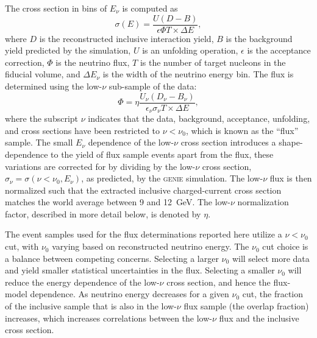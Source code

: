 \documentclass[%
reprint,
% 
superscriptaddress,
showpacs,
preprintnumbers,
showkeys,
nofootinbib,
 amsmath,amssymb,
 aps,
 prd,
floatfix,
]{revtex4-1}
\newcommand\lownu    {low-$\nu$\xspace}
\newcommand\enu      {$E_\nu$\xspace}
\newcommand\GENIE  {\textsc{genie}\xspace}
\begin{document}
The cross section in bins of \enu is computed as
\begin{equation}
    \sigma(E) = \frac{U(D-B)}{\epsilon\Phi T\times\Delta E},
    \label{eq:cross-section}
\end{equation}
where $D$ is the reconstructed inclusive interaction yield, $B$ is the background yield predicted by the simulation, $U$ is an unfolding operation, $\epsilon$ is the acceptance correction, $\Phi$ is the neutrino flux, $T$ is the number of target nucleons in the fiducial volume, and $\Delta E_\nu$ is the width of the neutrino energy bin. The flux is determined using the \lownu sub-sample of the data:
\begin{equation}
    \Phi = \eta\frac{U_\nu(D_\nu-B_\nu)}{\epsilon_\nu\sigma_\nu T\times\Delta E},
    \label{eq:flux}
\end{equation}
where the subscript $\nu$ indicates that the data, background, acceptance, unfolding, and cross sections have been restricted to $\nu<\nu_0$, which is known as the ``flux'' sample. The small \enu dependence of the \lownu cross section introduces a shape-dependence to the yield of flux sample events apart from the flux, these variations are corrected for by dividing by the \lownu cross section, $\sigma_\nu=\sigma(\nu<\nu_0,E_\nu)$, as predicted, by the \GENIE simulation. The \lownu flux is then normalized such that the extracted inclusive charged-current cross section matches the world average between 9 and 12~GeV. The \lownu normalization factor, described in more detail below, is denoted by $\eta$. 

The event samples used for the flux determinations reported here utilize a $\nu < \nu_0$ cut, with $\nu_0$ varying based on reconstructed neutrino energy. The $\nu_0$ cut choice is a balance between competing concerns. Selecting a larger $\nu_0$ will select more data and yield smaller statistical uncertainties in the flux. Selecting a smaller $\nu_0$ will reduce the energy dependence of the \lownu cross section, and hence the flux-model dependence. As neutrino energy decreases for a given $\nu_0$ cut, the fraction of the inclusive sample that is also in the \lownu flux sample (the overlap fraction) increases, which increases correlations between the \lownu flux and the inclusive cross section. 
\end{document}
